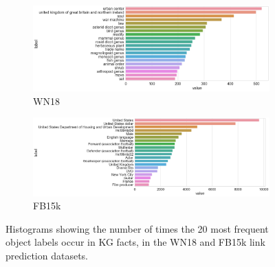 \begin{figure}[H]
	\begin{subfigure}[b]{.5\linewidth}
   		\centering
    		\includegraphics[width=1.0\linewidth, height=0.6\linewidth]{WN18_Object_Counts}
		\captionsetup{justification=centering}
		\caption{WN18}
	\end{subfigure}
	\begin{subfigure}[b]{.5\linewidth}
   		\centering
		\includegraphics[width=1.0\linewidth, height=0.6\linewidth]{FB15k_Object_Counts}
		\captionsetup{justification=centering}
		\caption{FB15k}
	\end{subfigure}
	\caption{Histograms showing the number of times the 20 most frequent object labels occur in KG facts, in the WN18 and FB15k link prediction datasets.}
\end{figure}

